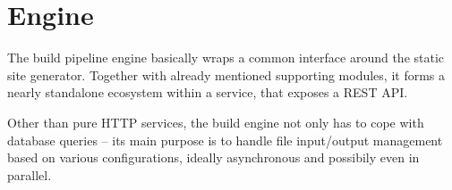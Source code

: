 \section{Engine}
\label{sec:engine}

The build pipeline engine basically wraps a common interface around the static site generator. Together with already mentioned supporting modules, it forms a nearly standalone ecosystem within a service, that exposes a REST API.

Other than pure HTTP services, the build engine not only has to cope with database queries -- its main purpose is to handle file input/output management based on various configurations, ideally asynchronous and possibily even in parallel.
